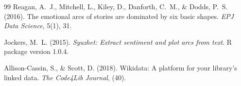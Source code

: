 \documentclass[review]{elsarticle}
\begin{document}
\begin{thebibliography}{99}
Reagan, A.~J., Mitchell, L., Kiley, D., Danforth, C.~M., \& Dodds, P.~S. (2016). The emotional arcs of stories are dominated by six basic shapes. \emph{EPJ Data Science}, 5(1), 31.

Jockers, M.~L. (2015). \emph{Syuzhet: Extract sentiment and plot arcs from text}. R package version 1.0.4.

Allison-Cassin, S., \& Scott, D. (2018). Wikidata: A platform for your library's linked data. \emph{The Code4Lib Journal}, (40).

\end{thebibliography}
\end{document}
